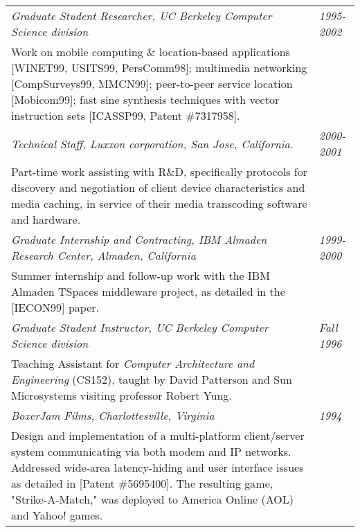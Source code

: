 \begin{tabular}{p{5.2in}@{\hspace{1.5cm}}l}
	  
    \em Graduate Student Researcher, UC Berkeley Computer Science division
                                                                 & \em 1995-2002 \\[3pt]
       Work on mobile computing \& location-based applications 
       [WINET99, USITS99, PersComm98]; 
       multimedia networking [CompSurveys99, MMCN99];
       peer-to-peer service location [Mobicom99];
       fast sine synthesis techniques with vector instruction 
       sets [ICASSP99, Patent \#7317958]. \\[9pt]
       	  

    \em Technical Staff, Luxxon corporation, San Jose, California. &\em  2000-2001 \\[3pt]
       Part-time work assisting with R\&D, specifically
       protocols for discovery and negotiation of client
       device characteristics and media caching, in service of their media transcoding
       software and hardware. \\[9pt]

    \em Graduate Internship and Contracting, IBM Almaden Research Center, 
          Almaden, California                         & \em 1999-2000 \\[3pt]
       Summer internship and follow-up work with
       the IBM Almaden TSpaces middleware project, as detailed in the [IECON99] paper. \\[9pt]


    \em Graduate Student Instructor, UC Berkeley Computer Science division
                                                                 & \em Fall 1996 \\[3pt]
       Teaching Assistant for {\em Computer Architecture and
       Engineering} (CS152), taught by David Patterson and
       Sun Microsystems visiting professor Robert Yung. \\[9pt]



    \em BoxerJam Films, Charlottesville, Virginia                & \em 1994 \\[3pt]
       Design and implementation of a multi-platform
       client/server system communicating via both modem and IP
       networks.  Addressed wide-area latency-hiding and user interface
       issues as detailed in [Patent \#5695400].  The resulting game, "Strike-A-Match,"
       was deployed to America Online (AOL) and Yahoo! games.
       \\[9pt]



\end{tabular}
